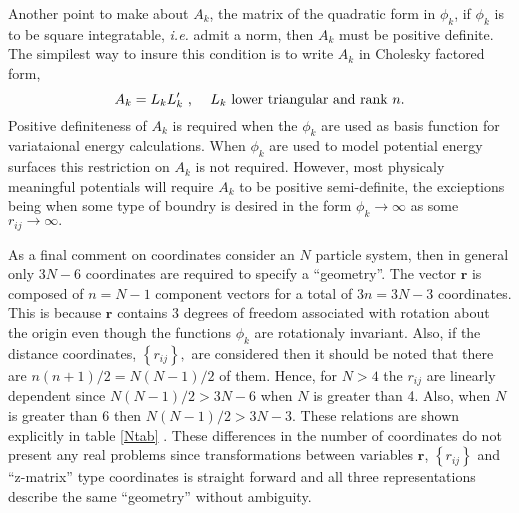 \documentclass[12pt,thmsa]{article}
\begin{document}
Another point to make about $A_k$, the matrix of the quadratic form in $\phi
_k$, if $\phi _k$ is to be square integratable, \textit{i.e.} admit a norm,
then $A_k$ must be positive definite. The simpilest way to insure this
condition is to write $A_k$ in Cholesky factored form, 
\begin{equation}
A_k=L_kL_k^{\prime }\text{ ,\thinspace \thinspace \thinspace \thinspace
\thinspace \thinspace \thinspace \thinspace }L_k\text{ lower triangular and
rank }n.
\end{equation}
Positive definiteness of $A_k$ is required when the $\phi _k$ are used as
basis function for variataional energy calculations. When $\phi _k$ are used
to model potential energy surfaces this restriction on $A_k$ is not
required. However, most physicaly meaningful potentials will require $A_k$
to be positive semi-definite, the excieptions being when some type of
boundry is desired in the form $\phi _k\rightarrow \infty $ as some $%
r_{ij}\rightarrow \infty .$

As a final comment on coordinates consider an $N$ particle system, then in
general only $3N-6$ coordinates are required to specify a ``geometry''. The
vector $\mathbf{r}$ is composed of $n=N-1$ component vectors for a total of $%
3n=3N-3$ coordinates. This is because $\mathbf{r}$ contains 3 degrees of
freedom associated with rotation about the origin even though the functions $%
\phi _k$ are rotationaly invariant. Also, if the distance coordinates, $%
\left\{ r_{ij}\right\} ,$ are considered then it should be noted that there
are $n\left( n+1\right) /2=N\left( N-1\right) /2$ of them. Hence, for $N>4$
the $r_{ij}$ are linearly dependent since $N\left( N-1\right) /2>3N-6$ when $%
N$ is greater than 4. Also, when $N$ is greater than 6 then $N\left(
N-1\right) /2>3N-3.$ These relations are shown explicitly in table \ref{Ntab}%
. These differences in the number of coordinates do not present any real
problems since transformations between variables $\mathbf{r}$, $\left\{
r_{ij}\right\} $ and ``z-matrix'' type coordinates is straight forward and
all three representations describe the same ``geometry'' without ambiguity.
\end{document}
